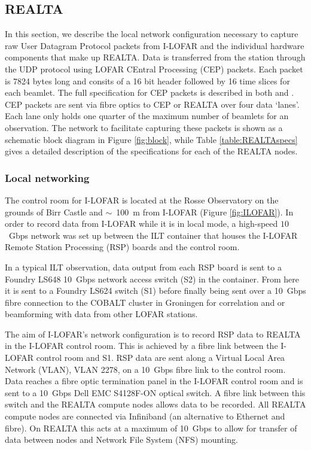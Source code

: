 \subsection{REALTA}
\label{sec:REALTA}
In this section, we describe the local network configuration necessary to capture raw User Datagram Protocol \citep[UDP;][]{Postel} packets from I-LOFAR and the individual hardware components that make up REALTA. Data is transferred from the station through the UDP protocol using LOFAR CEntral Processing (CEP) packets. Each packet is 7824 bytes long and consits of a 16 bit header followed by 16 time slices for each beamlet. The full specification for CEP packets is described in both \cite{Lubberhuizen2009} and \citet{Virtanen2018}.  CEP packets are sent via fibre optics to CEP or REALTA over four data `lanes'. Each lane only holds one quarter of the maximum number of beamlets for an observation.
The network to facilitate capturing these packets is shown as a schematic block diagram in Figure \ref{fig:block}, while Table \ref{table:REALTAspecs} gives a detailed description of the specifications for each of the REALTA nodes. 

\subsubsection{Local networking}
\label{sec:network}
The control room for I-LOFAR is located at the Rosse Observatory on the grounds of Birr Castle and $\sim$~100~m from I-LOFAR (Figure \ref{fig:ILOFAR}). In order to record data from I-LOFAR while it is in local mode, a high-speed $10$~Gbps network was set up between the ILT container that houses the I-LOFAR Remote Station Processing (RSP) boards and the control room.

In a typical ILT observation, data output from each RSP board is sent to a Foundry LS648 10~Gbps network access switch (S2) in the container. From here it is sent to a Foundry LS624 switch (S1) before finally being sent over a 10~Gbps fibre connection to the COBALT cluster in Groningen for correlation and or beamforming with data from other LOFAR stations.

The aim of I-LOFAR's network configuration is to record RSP data to REALTA in the I-LOFAR control room. This is achieved by a fibre link between the I-LOFAR control room and S1. RSP data are sent along a Virtual Local Area Network (VLAN), VLAN 2278, on a 10~Gbps fibre link to the control room. Data reaches a fibre optic termination panel in the I-LOFAR control room and is sent to a 10~Gbps Dell EMC S4128F-ON optical switch. A fibre link between this switch and the REALTA compute nodes allows data to be recorded. All REALTA compute nodes are connected via Infiniband (an alternative to Ethernet and fibre). On REALTA this acts at a maximum of 10~Gbps to allow for transfer of data between nodes and Network File System (NFS) mounting.

